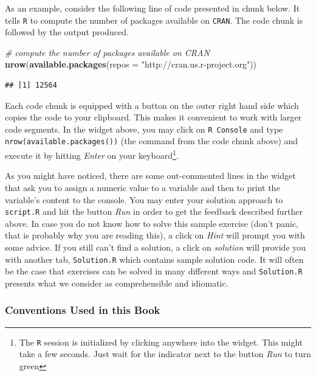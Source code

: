 \documentclass[]{book}
\newenvironment{Shaded}{\begin{snugshade}}{\end{snugshade}}
\newcommand{\KeywordTok}[1]{\textcolor[rgb]{0.13,0.29,0.53}{\textbf{#1}}}
\newcommand{\DataTypeTok}[1]{\textcolor[rgb]{0.13,0.29,0.53}{#1}}
\newcommand{\StringTok}[1]{\textcolor[rgb]{0.31,0.60,0.02}{#1}}
\newcommand{\CommentTok}[1]{\textcolor[rgb]{0.56,0.35,0.01}{\textit{#1}}}
\newcommand{\NormalTok}[1]{#1}
\let\rmarkdownfootnote\footnote%
\def\footnote{\protect\rmarkdownfootnote}
\theoremstyle{definition}
\theoremstyle{definition}
\theoremstyle{definition}
\theoremstyle{remark}
\begin{document}
As an example, consider the following line of code presented in chunk
below. It tells \texttt{R} to compute the number of packages available
on \texttt{CRAN}. The code chunk is followed by the output produced.

\begin{Shaded}
\begin{Highlighting}[]
\CommentTok{# compute the number of packages available on CRAN}
\KeywordTok{nrow}\NormalTok{(}\KeywordTok{available.packages}\NormalTok{(}\DataTypeTok{repos =} \StringTok{"http://cran.us.r-project.org"}\NormalTok{))}
\end{Highlighting}
\end{Shaded}

\begin{verbatim}
## [1] 12564
\end{verbatim}

Each code chunk is equipped with a button on the outer right hand side
which copies the code to your clipboard. This makes it convenient to
work with larger code segments. In the widget above, you may click on
\texttt{R Console} and type \texttt{nrow(available.packages())} (the
command from the code chunk above) and execute it by hitting
\emph{Enter} on your keyboard\footnote{The \texttt{R} session is
  initialized by clicking anywhere into the widget. This might take a
  few seconds. Just wait for the indicator next to the button \emph{Run}
  to turn green}.

As you might have noticed, there are some out-commented lines in the
widget that ask you to assign a numeric value to a variable and then to
print the variable's content to the console. You may enter your solution
approach to \texttt{script.R} and hit the button \emph{Run} in order to
get the feedback described further above. In case you do not know how to
solve this sample exercise (don't panic, that is probably why you are
reading this), a click on \emph{Hint} will prompt you with some advice.
If you still can't find a solution, a click on \emph{solution} will
provide you with another tab, \texttt{Solution.R} which contains sample
solution code. It will often be the case that exercises can be solved in
many different ways and \texttt{Solution.R} presents what we consider as
comprehensible and idiomatic.

\subsubsection*{Conventions Used in this
Book}\label{conventions-used-in-this-book}
\end{document}
